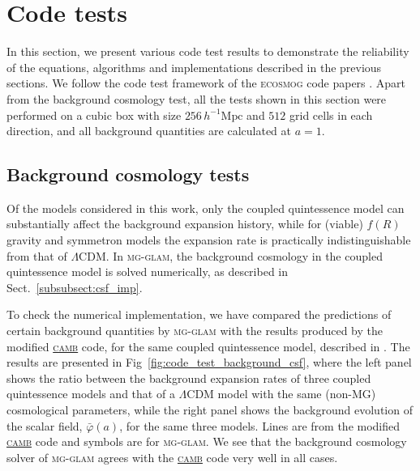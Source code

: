 \section{Code tests}
\label{sect:code_tests}

In this section, we present various code test results to demonstrate the reliability of the equations, algorithms and implementations described in the previous sections. We follow the code test framework of the \textsc{ecosmog} code papers \citep{Li:2011_ECOSMOG_code_paper,Li:2013_ECOSMOGV_code_paper}. Apart from the background cosmology test, all the tests shown in this section were performed on a cubic box with size $256 \, h^{-1} \mathrm{Mpc}$ and $512$ grid cells in each direction, and all background quantities are calculated at $a = 1$. 




\subsection{Background cosmology tests}
\label{subsect:bg_tests}

Of the models considered in this work, only the coupled quintessence model can substantially affect the background expansion history, while for (viable) $f(R)$ gravity and symmetron models the expansion rate is practically indistinguishable from that of $\Lambda$CDM. In \textsc{mg}-\textsc{glam}, the background cosmology in the coupled quintessence model is solved numerically, as described in Sect.~\ref{subsubsect:csf_imp}. 

To check the numerical implementation, we have compared the predictions of certain background quantities by \textsc{mg}-\textsc{glam} with the results produced by the modified \href{https://camb.info/}{\textsc{camb}} code, for the same coupled quintessence model, described in \cite{Li:2010re}. The results are presented in Fig~\ref{fig:code_test_background_csf}, where the left panel shows the ratio between the background expansion rates of three coupled quintessence models and that of a $\Lambda$CDM model with the same (non-MG) cosmological parameters, while the right panel shows the background evolution of the scalar field, $\bar{\varphi}(a)$, for the same three models. Lines are from the modified \href{https://camb.info/}{\textsc{camb}} code and symbols are for \textsc{mg-glam}. We see that the background cosmology solver of \textsc{mg-glam} agrees with the \href{https://camb.info/}{\textsc{camb}} code very well in all cases.


